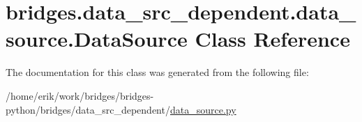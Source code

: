 \hypertarget{classbridges_1_1data__src__dependent_1_1data__source_1_1_data_source}{}\section{bridges.\+data\+\_\+src\+\_\+dependent.\+data\+\_\+source.\+Data\+Source Class Reference}
\label{classbridges_1_1data__src__dependent_1_1data__source_1_1_data_source}


The documentation for this class was generated from the following file\+:\begin{DoxyCompactItemize}
\item 
/home/erik/work/bridges/bridges-\/python/bridges/data\+\_\+src\+\_\+dependent/\hyperlink{data__source_8py}{data\+\_\+source.\+py}\end{DoxyCompactItemize}
